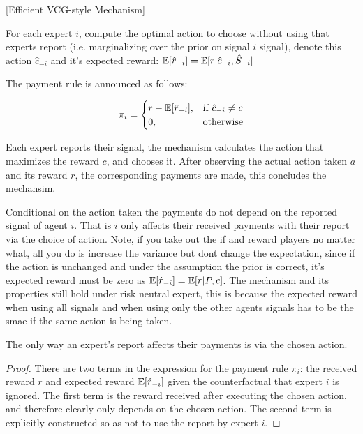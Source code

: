\begin{mech}\label{mech:vcg-style}[Efficient VCG-style Mechanism]



For each expert $i$, compute the optimal action to choose without using that experts report (i.e. marginalizing over the prior on signal $i$ signal), denote this action $\hat{c}_{-i}$ and it's expected reward: $\operatorname*{\mathbb E}[\hat{r}_{-i}] = \operatorname*{\mathbb E}[ r| \hat{c}_{-i}, \hat{S}_{-i}] $


The payment rule is announced as follows:

\[
    \pi_i = 
\begin{cases}
    r - \expec[\hat{r}_{-i}] ,& \text{if } \hat{c}_{-i} \neq c\\
    0,              & \text{otherwise}
\end{cases}
\]

%

Each expert reports their signal, the mechanism calculates the action that maximizes the reward $c$, and chooses it. After observing the actual action taken $a$ and its reward $r$, the corresponding payments are made, this concludes the mechansim.

\end{mech}


Conditional on the action taken the payments do not depend on the reported signal of agent $i$. That is $i$ only affects their received payments with their report via the choice of action. 
Note, if you take out the if and reward players no matter what, all you do is increase the variance but dont change the expectation, since if the action is unchanged and under the assumption the prior is correct, it's expected reward must be zero as $\operatorname*{\mathbb E}[\hat{r}_{-i}] = \operatorname*{\mathbb E}[r|P,c]$. The  mechanism and its properties still hold under risk neutral expert,  this is because the expected reward when using all signals and when using only the other agents signals has to be the smae if the same action is being taken. 


\begin{lem}\label{lem:affect}
	The only way an expert's report affects their payments is via the chosen action.
\end{lem}

\begin{proof}
There are two terms in the expression for the payment rule $\pi_i$: the received reward $r$ and expected reward $\operatorname*{\mathbb E}[\hat{r}_{-i}]$ given the counterfactual that expert $i$ is ignored. 
The first term is the reward received after executing the chosen action, and therefore clearly only depends on the chosen action. 
The second term is explicitly constructed so as not to use the report by expert $i$. 
\end{proof}


